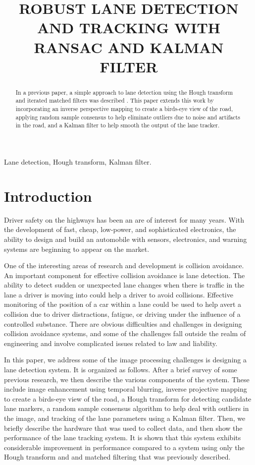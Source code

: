 \documentclass{article}
\title{ROBUST LANE DETECTION AND TRACKING WITH RANSAC AND KALMAN FILTER}
\begin{document}
%
\maketitle
%
\begin{abstract}
In a previous paper, a simple approach to lane detection using the Hough
transform and iterated matched filters was described \cite{borkar_layered_2009}.
This paper extends this work by incorporating an inverse perspective mapping
to create a birds-eye view of the road, applying random sample consensus to help
eliminate outliers due to noise and artifacts in the road, and a Kalman filter
to help smooth the output of the lane tracker.
\end{abstract}
%
\begin{keywords}
Lane detection, Hough transform, Kalman filter.
\end{keywords}
%
\section{Introduction}
\label{sec:intro}
Driver safety on the highways has been an are of interest for many years.
With the development of fast, cheap, low-power, and sophisticated electronics,
the ability to design and build an automobile with sensors, electronics, and
warning systems are beginning to appear on the market.

One of the interesting areas of research and development is collision avoidance.
An important component for effective collision avoidance is lane detection.
The ability to detect sudden or unexpected lane changes when there
is traffic in the lane a driver is moving into could help a driver to avoid
collisions.
Effective monitoring of the position of a car within a lane could be used to
help avert a collision due to driver distractions, fatigue, or driving under the influence of a controlled substance.
There are obvious difficulties and challenges in designing collision avoidance
systems, and some of the challenges fall outside the realm of engineering and
involve complicated issues related to law and liability.

In this paper, we address some of the image processing challenges is designing a
lane detection system.  It is organized as follows.
After a brief survey of some previous research, we then describe the various
components of the system.  These include image enhancement using temporal blurring,
inverse projective mapping to create a birds-eye view of the road, a Hough transform
for detecting candidate lane markers, a random sample consensus algorithm to
help deal with outliers in the image, and tracking of the lane parameters using a Kalman filter.
Then, we briefly describe the hardware that was used to collect data, and
then show the performance of the lane tracking system.
It is shown that this system exhibits considerable improvement in
performance compared to a system using only the Hough transform and and matched filtering that was previously described.
\end{document}
